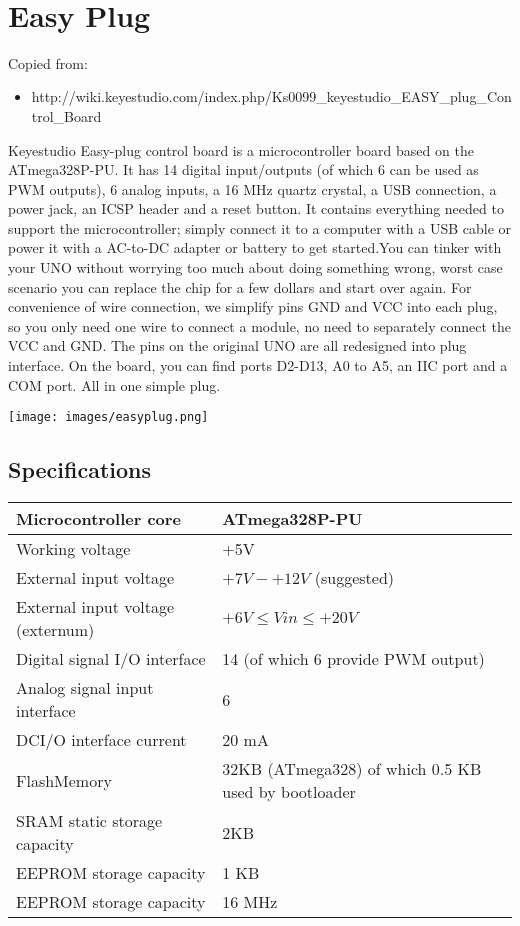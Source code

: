\MDNAME\

\section{Easy Plug}

Copied from:

\begin{itemize}
\item
  http://wiki.keyestudio.com/index.php/Ks0099\_keyestudio\_EASY\_plug\_Control\_Board
\end{itemize}

Keyestudio Easy-plug control board is a microcontroller board based on
the ATmega328P-PU. It has 14 digital input/outputs (of which 6 can be
used as PWM outputs), 6 analog inputs, a 16 MHz quartz crystal, a USB
connection, a power jack, an ICSP header and a reset button. It contains
everything needed to support the microcontroller; simply connect it to a
computer with a USB cable or power it with a AC-to-DC adapter or battery
to get started.You can tinker with your UNO without worrying too much
about doing something wrong, worst case scenario you can replace the
chip for a few dollars and start over again. For convenience of wire
connection, we simplify pins GND and VCC into each plug, so you only
need one wire to connect a module, no need to separately connect the VCC
and GND. The pins on the original UNO are all redesigned into plug
interface. On the board, you can find ports D2-D13, A0 to A5, an IIC
port and a COM port. All in one simple plug.

\texttt{[image: images/easyplug.png]}

\subsection{Specifications}

\begin{longtable}[]{@{}ll@{}}
\toprule
Microcontroller core & ATmega328P-PU\tabularnewline
\midrule
\endhead
Working voltage & +5V\tabularnewline
External input voltage & \(+7V - +12V\) (suggested)\tabularnewline
External input voltage (externum) &
\(+6V \leq Vin \leq +20V\)\tabularnewline
Digital signal I/O interface & 14 (of which 6 provide PWM
output)\tabularnewline
Analog signal input interface & 6\tabularnewline
DCI/O interface current & 20 mA\tabularnewline
FlashMemory & 32KB (ATmega328) of which 0.5 KB used by
bootloader\tabularnewline
SRAM static storage capacity & 2KB\tabularnewline
EEPROM storage capacity & 1 KB\tabularnewline
EEPROM storage capacity & 16 MHz\tabularnewline
\bottomrule
\end{longtable}

